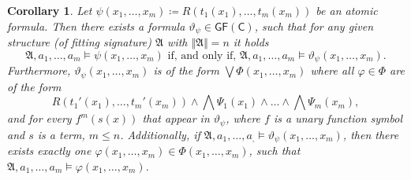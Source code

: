 \documentclass[a4paper,11pt,DIV=15]{scrartcl} %
\renewcommand{\phi}{\varphi}
\theoremstyle{plain}
\newtheorem{corollary}[theorem]{Corollary}
\theoremstyle{definition}
\newcommand{\GFC}{\mathsf{GF}(\mathsf{C})}
\renewcommand{\theta}{\vartheta}
\begin{document}
\begin{corollary}
	Let $\psi(x_1,\dots,x_m)\coloneqq R(t_1(x_1),\dots,t_m(x_m))$ be an atomic formula.
	Then there exists a formula $\theta_\psi\in\GFC$, such that for any given structure (of fitting signature) $\mathfrak A$ with $\Vert\mathfrak A \Vert=n$ it holds
	$$\mathfrak A,a_1,\dots,a_m\models \psi(x_1,\dots,x_m) \text{ if, and only if, } \mathfrak A,a_1,\dots,a_m\models \theta_\psi(x_1,\dots,x_m).$$
	Furthermore, $\theta_\psi(x_1,\dots,x_m)$ is of the form $\bigvee \Phi(x_1,\dots,x_m)$ where all $\phi\in\Phi$ are of the form
	$$R(t_1'(x_1),\dots,t_m'(x_m))\land \bigwedge\Psi_1(x_1)\land \dots\land\bigwedge \Psi_m(x_m),$$
	and for every $f^m(s(x))$ that appear in $\theta_\psi$, where $f$ is a unary function symbol and $s$ is a term, $m\leq n$.
	Additionally, if $\mathfrak A,a_1,\dots,a_,\models \theta_\psi(x_1,\dots,x_m)$, then there exists exactly one $\phi(x_1,\dots,x_m)\in\Phi(x_1,\dots,x_m)$, such that $\mathfrak A,a_1,\dots,a_m\models \phi(x_1,\dots,x_m)$.
	\label{TranslationOfArbAtomics}
\end{corollary}
\end{document}
